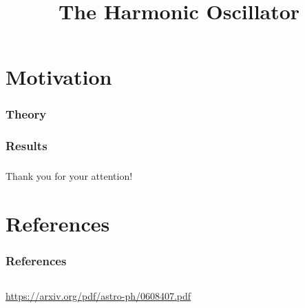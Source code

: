 \documentclass[aspectratio=169]{beamer}
\title[Xenon1T]{The Harmonic Oscillator}
\author[]{}
\date{\printdate{24.03.2020}} %
\institute{Computational Physics}
\begin{document}
\begin{frame}
	\titlepage
\end{frame}


\section{Motivation}
\begin{frame}

\end{frame}

\begin{frame}
\frametitle{Theory}

\end{frame}

\begin{frame}
\frametitle{Results}

\end{frame}


\begin{frame}
\frametitle{}
\begin{center}
	Thank you for your attention!
\end{center}
\end{frame}

\section{References}
\begin{frame}
\frametitle{References}
\vspace{-20px}
\begin{columns}[T]
	\begin{column}{0.35\textwidth}
		\begin{tiny}
			\begin{thebibliography}{99}
				\fontsize{6}{6}
				\url{https://arxiv.org/pdf/astro-ph/0608407.pdf}
			\end{thebibliography}
		\end{tiny}
	\end{column}
\end{columns}
\end{frame}



\appendixstyle

\appendix
\end{document}

